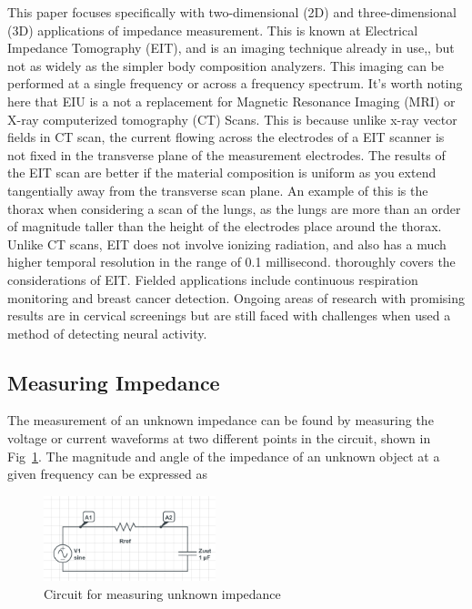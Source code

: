 \documentclass[]{IEEEtran}
\begin{document}
This paper focuses specifically with two-dimensional (2D) and three-dimensional (3D) applications of impedance measurement. This is known at Electrical Impedance Tomography (EIT), and is an imaging technique already in use\cite{noauthor_body_nodate},\cite{noauthor_our_nodate}, but not as widely as the simpler body composition analyzers. This imaging can be performed at a single frequency or across a frequency spectrum. It's worth noting here that EIU is a not a replacement for Magnetic Resonance Imaging (MRI) or X-ray computerized tomography (CT) Scans. This is because unlike x-ray vector fields in CT scan, the current flowing across the electrodes of a EIT scanner is not fixed in the transverse plane of the measurement electrodes. The results of the EIT scan are better if the material composition is uniform as you extend tangentially away from the transverse scan plane. An example of this is the thorax when considering a scan of the lungs, as the lungs are more than an order of magnitude taller than the height of the electrodes place around the thorax. Unlike CT scans, EIT does not involve ionizing radiation, and also has a much higher temporal resolution in the range of 0.1 millisecond\cite{noauthor_electrical_2004}. \cite{adler_electrical_2017} thoroughly covers the considerations of EIT. Fielded applications include continuous respiration monitoring and breast cancer detection\cite{assenheimer_t-scan_2001}. Ongoing areas of research with promising results are in cervical screenings\cite{brown_relation_2000} but are still faced with challenges when used a method of detecting neural activity\cite{gilad_impedance_2009}.

\subsection{Measuring Impedance}
The measurement of an unknown impedance can be found by measuring the voltage or current waveforms at two different points in the circuit, shown in Fig~\ref{fig:zun}\cite{noauthor_oscilloscope_nodate}. The magnitude and angle of the impedance of an unknown object at a given frequency can be expressed as

\begin{figure} %
\centering
\includegraphics[width=5cm ]{./graphics/zun.png}
\centering
\caption{Circuit for measuring unknown impedance}
\label{fig:zun}
\end{figure}
\end{document}
